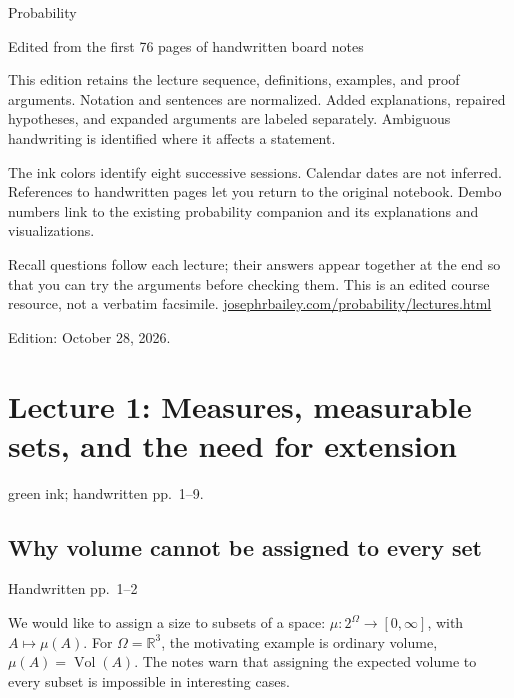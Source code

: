 \documentclass[11pt,letterpaper]{article}
\newcommand{\lecturesection}[1]{\subsection{#1}}
\begin{document}
\begin{titlepage}
\vspace*{0.5in}{\small MATH 230A / STAT 310A}\par\vspace{0.4in}
{\Huge Probability}\par\vspace{0.12in}{\LARGE Eight lectures in class order}\par\vspace{0.3in}
{\large Edited from the first 76 pages of handwritten board notes}\par\vspace{0.4in}
This edition retains the lecture sequence, definitions, examples, and proof arguments. Notation and sentences are normalized. Added explanations, repaired hypotheses, and expanded arguments are labeled separately. Ambiguous handwriting is identified where it affects a statement.

The ink colors identify eight successive sessions. Calendar dates are not inferred. References to handwritten pages let you return to the original notebook. Dembo numbers link to the existing probability companion and its explanations and visualizations.

Recall questions follow each lecture; their answers appear together at the end so that you can try the arguments before checking them. This is an edited course resource, not a verbatim facsimile.
\vfill
\href{https://josephrbailey.com/probability/lectures.html}{josephrbailey.com/probability/lectures.html}\par
Edition: October 28, 2026.
\end{titlepage}
\tableofcontents\newpage

\clearpage
{}
\section{Lecture 1: Measures, measurable sets, and the need for extension}
{\small green ink; handwritten pp.\ 1--9.}

\hypertarget{l1-s1}{}
\lecturesection{Why volume cannot be assigned to every set}
{\small\textcolor{lectureink}{Handwritten pp.\ 1--2}}

We would like to assign a size to subsets of a space: $\mu:2^\Omega\to[0,\infty]$, with $A\mapsto\mu(A)$. For $\Omega=\mathbb R^3$, the motivating example is ordinary volume, $\mu(A)=\operatorname{Vol}(A)$. The notes warn that assigning the expected volume to every subset is impossible in interesting cases.
\end{document}
